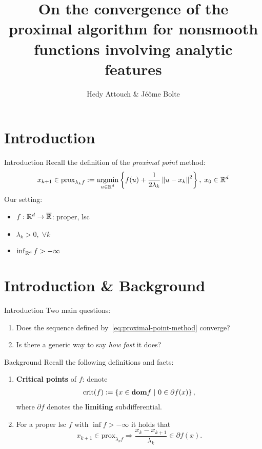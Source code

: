 \documentclass[10pt]{beamer}
\begin{document}
\title{On the convergence of the proximal algorithm for nonsmooth functions
involving analytic features}
\author{Hedy Attouch \& J{\'e}{\^o}me Bolte}
\frame{\titlepage}
\frame{\tableofcontents}

\section{Introduction}

\begin{frame}{Introduction}
Recall the definition of the \textit{proximal point} method:
\begin{equation}
	x_{k+1} \in \mathrm{prox}_{\lambda_k f}
	:= \operatorname*{argmin}_{u \in \mathbb{R}^d} \left\{ 
	f(u) + \frac{1}{2 \lambda_k} \left \| u - x_k \right \|^2  \right\}, \;
	x_0 \in \mathbb{R}^d
	\label{eq:proximal-point-method}
\end{equation}
Our setting:
\begin{itemize}
	\item $f: \mathbb{R}^d \to \overline{\mathbb{R}}$: proper, lsc
	\item $\lambda_k > 0, \; \forall k$
	\item $\inf_{\mathbb{R}^d} f > -\infty$
\end{itemize}
\end{frame}

\section{Introduction \& Background}

\begin{frame}{Introduction}
	Two main questions:
	\begin{enumerate}
		\item<1-> Does the sequence defined by~\cref{eq:proximal-point-method}
			converge?
		\item<2-> Is there a generic way to say \textit{how fast} it does?
	\end{enumerate}

\end{frame}

\begin{frame}{Background}
	Recall the following definitions and facts:
	\begin{enumerate}
		\item \textbf{Critical points} of $f$: denote
			\begin{align*}
				\mathrm{crit}(f) := \left\{ x \in \textbf{dom} f \ \middle| \  0 \in \partial
				f(x) \right\},
			\end{align*}
			where $\partial f$ denotes the \textbf{limiting} subdifferential.
		\item For a proper lsc $f$ with $\inf f > -\infty$ it holds that
			\[
				x_{k+1} \in \mathrm{prox}_{\lambda_k f}
				\Rightarrow \frac{x_k - x_{k+1}}{\lambda_k} \in \partial f(x).
			\]
	\end{enumerate}
\end{frame}
\end{document}
